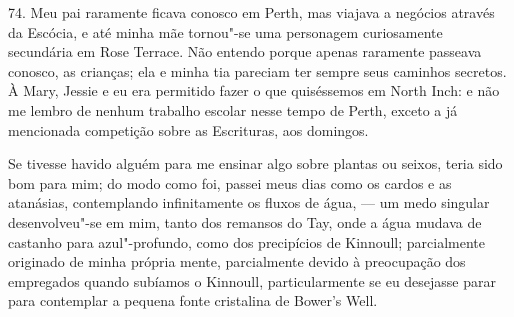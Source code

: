 74. Meu pai raramente ficava conosco em Perth, mas viajava a negócios
através da Escócia, e até minha mãe tornou"-se uma personagem
curiosamente secundária em Rose Terrace. Não entendo porque apenas
raramente passeava conosco, as crianças; ela e minha tia pareciam ter
sempre seus caminhos secretos. À Mary, Jessie e eu era permitido fazer o
que quiséssemos em North Inch: e não me lembro de nenhum trabalho
escolar nesse tempo de Perth, exceto a já mencionada competição sobre as
Escrituras, aos domingos.

Se tivesse havido alguém para me ensinar algo sobre plantas ou seixos,
teria sido bom para mim; do modo como foi, passei meus dias como os
cardos e as atanásias, contemplando infinitamente os fluxos de água, ---
um medo singular desenvolveu"-se em mim, tanto dos remansos do Tay, onde
a água mudava de castanho para azul"-profundo, como dos precipícios de
Kinnoull; parcialmente originado de minha própria mente, parcialmente
devido à preocupação dos empregados quando subíamos o Kinnoull,
particularmente se eu desejasse parar para contemplar a pequena fonte
cristalina de Bower's Well.

